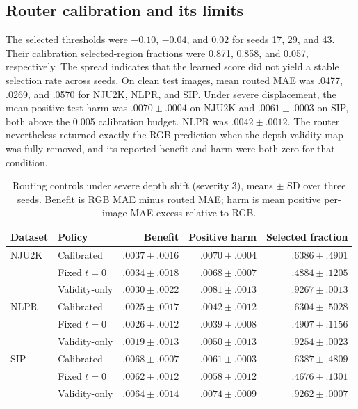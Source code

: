\documentclass[11pt]{article}
\begin{document}
\subsection{Router calibration and its limits}
The selected thresholds were $-0.10$, $-0.04$, and $0.02$ for seeds 17, 29, and 43. Their calibration selected-region fractions were 0.871, 0.858, and 0.057, respectively. The spread indicates that the learned score did not yield a stable selection rate across seeds. On clean test images, mean routed MAE was .0477, .0269, and .0570 for NJU2K, NLPR, and SIP. Under severe displacement, the mean positive test harm was $.0070\pm.0004$ on NJU2K and $.0061\pm.0003$ on SIP, both above the 0.005 calibration budget. NLPR was $.0042\pm.0012$. The router nevertheless returned exactly the RGB prediction when the depth-validity map was fully removed, and its reported benefit and harm were both zero for that condition.

\begin{table}[t]\centering\small
\caption{Routing controls under severe depth shift (severity 3), means $\pm$ SD over three seeds. Benefit is RGB MAE minus routed MAE; harm is mean positive per-image MAE excess relative to RGB.}
\label{tab:routing}
\begin{tabular}{llrrr}\toprule Dataset & Policy & Benefit & Positive harm & Selected fraction\\\midrule
NJU2K & Calibrated & $.0037\pm.0016$ & $.0070\pm.0004$ & $.6386\pm.4901$\\
 & Fixed $t=0$ & $.0034\pm.0018$ & $.0068\pm.0007$ & $.4884\pm.1205$\\
 & Validity-only & $.0030\pm.0022$ & $.0081\pm.0013$ & $.9267\pm.0013$\\\midrule
NLPR & Calibrated & $.0025\pm.0017$ & $.0042\pm.0012$ & $.6304\pm.5028$\\
 & Fixed $t=0$ & $.0026\pm.0012$ & $.0039\pm.0008$ & $.4907\pm.1156$\\
 & Validity-only & $.0019\pm.0013$ & $.0050\pm.0013$ & $.9254\pm.0023$\\\midrule
SIP & Calibrated & $.0068\pm.0007$ & $.0061\pm.0003$ & $.6387\pm.4809$\\
 & Fixed $t=0$ & $.0062\pm.0012$ & $.0058\pm.0012$ & $.4676\pm.1301$\\
 & Validity-only & $.0064\pm.0014$ & $.0074\pm.0009$ & $.9262\pm.0007$\\\bottomrule\end{tabular}
\end{table}
\end{document}
